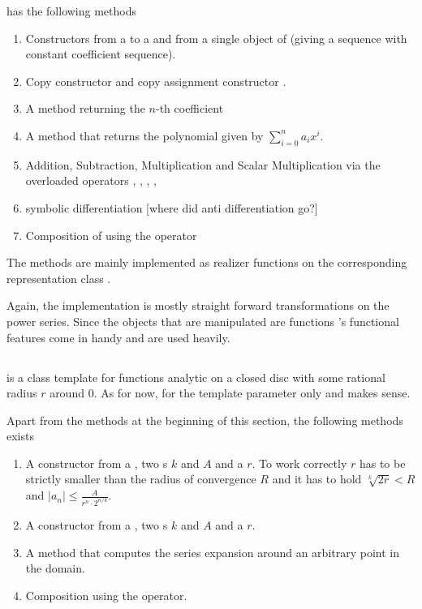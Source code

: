 			\powerseries has the following methods
			\begin{enumerate}
				\item Constructors from a  to a  and from a single object of  (giving a sequence with constant coefficient sequence).
				\item Copy constructor  and copy assignment constructor 
				.
				\item A method  returning the $n$-th coefficient
				\item A method  that returns the polynomial given by 
				$ \sum_{i=0}^n a_i x^i $.

				\item Addition, Subtraction, Multiplication and Scalar Multiplication via the overloaded operators \code{+}, \code{-}, \code{*}, \code{+=}, \code{*=}
				\item symbolic differentiation  [where did anti differentiation go?]
				\item Composition of \powerseries using the operator \code{()}
			\end{enumerate}
			The methods are mainly implemented as realizer functions on the corresponding representation class . 

			Again, the implementation is mostly straight forward transformations on the power series. 
			Since the objects that are manipulated are functions {\ccx}'s functional features come in handy and are used heavily. 		


	\subsection{\baana}
		\textbf{} is a class template for functions analytic on a closed disc with some rational radius $r$ around $0$. 
		As for now, for the template parameter  only \real and \complex makes sense. 
		
		Apart from the methods at the beginning of this section, the following methods exists
		\begin{enumerate}
			\item A constructor from a \powerseries, two s $k$ and $A$ and a  $r$.
			To work correctly $r$ has to be strictly smaller than the radius of convergence $R$ 
			and it has to hold $\sqrt[k]{2r} < R$ and $|a_n| \leq \frac{A}{r^n \cdot 2^{n/k}}$.
			\item A constructor from a \func, two s $k$ and $A$ and a  $r$.
			\item A method  that computes the series expansion around
			an arbitrary point in the domain.
			\item Composition using the \code{()} operator.
		\end{enumerate}
		
